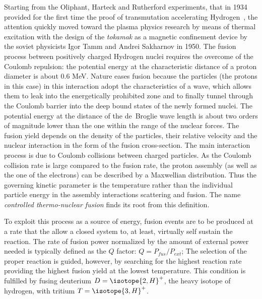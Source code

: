 Starting from the Oliphant, Harteck and Rutherford experiments, that in 1934 provided for the first time the proof of transmutation accelerating Hydrogen~\cite{1934RSPSA.144..692O}, the attention quickly moved toward the plasma physics research by means of thermal excitation with the design of the \textit{tokamak} as a magnetic confinement device by the soviet physicists Igor Tamm and Andrei Sakharnov in 1950.%
%
The fusion process between positively charged Hydrogen nuclei requires the overcome of the Coulomb repulsion: the potential energy at the characteristic distance of a proton diameter is about 0.6 MeV. Nature eases fusion because the particles (the protons in this case) in this interaction adopt the characteristics of a wave, which allows them to leak into the energetically prohibited zone and to finally tunnel through the Coulomb barrier into the deep bound states of the newly formed nuclei. The potential energy at the distance of the de~Broglie wave length is about two orders of magnitude lower than the one within the range of the nuclear forces. The fusion yield depends on the density of the particles, their relative velocity and the nuclear interaction in the form of the fusion cross-section. 
The main interaction process is due to Coulomb collisions between charged particles. As the Coulomb collision rate is large compared to the fusion rate, the proton assembly (as well as the one of the electrons) can be described by a Maxwellian distribution. Thus the governing kinetic parameter is the temperature rather than the individual particle energy in the assembly interactions scattering and fusion. The name \emph{controlled thermo-nuclear fusion} finds its root from this definition.

To exploit this process as a source of energy, fusion events are to be produced at a rate that the allow a closed system to, at least, virtually self sustain the reaction. 
\cite{Wagner.Friedrich:magnetic.confinement.intro}
The rate of fusion power normalized by the amount of external power needed is typically defined as the $Q$ factor: $ Q = P_{fus}/P_{ext}$; 
The selection of the proper reaction is guided, however, by searching for the highest reaction rate providing the highest fusion yield at the lowest temperature. This condition is fulfilled by fusing deuterium $D=\isotope{2,H}^+$, the heavy isotope of hydrogen, with tritium $T=\isotope{3,H}^+$.

